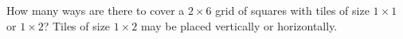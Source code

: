 How many ways are there to cover a $2\times6$ grid of squares with tiles of size $1\times1$ or $1\times2$? Tiles of size $1\times2$ may be placed vertically or horizontally.
